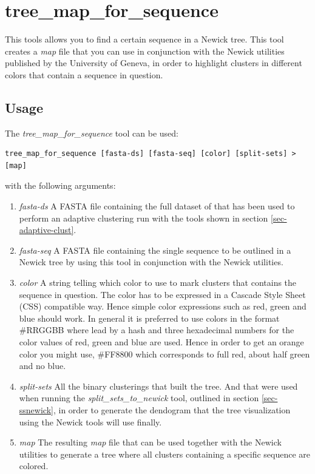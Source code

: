 \section{tree\_map\_for\_sequence} \label{sec-treemapseq}

This tools allows you to find a certain sequence in a Newick tree. This
tool creates a \emph{map} file that you can use in conjunction with the
Newick utilities \cite{newick_tools} published by the University of Geneva, in
order to highlight clusters in different colors that contain a
sequence in question.

\subsection{Usage}

The \emph{tree\_map\_for\_sequence} tool can be used:
\begin{lstlisting}
tree_map_for_sequence [fasta-ds] [fasta-seq] [color] [split-sets] > [map]
\end{lstlisting}
with the following arguments:
\begin{enumerate}
  \item \emph{fasta-ds} A FASTA file containing the full dataset of
    that has been used to perform an adaptive clustering run with the
    tools shown in section \ref{sec-adaptive-clust}.
  \item \emph{fasta-seq} A FASTA file containing the single sequence
    to be outlined in a Newick tree by using this tool in conjunction
    with the Newick utilities.
  \item \emph{color} A string telling which color to use to mark
    clusters that contains the sequence in question. The color has to
    be expressed in a Cascade Style Sheet (CSS) compatible way. Hence
    simple color expressions such as red, green and blue should
    work. In general it is preferred to use colors in the format
    \#RRGGBB where lead by a hash and three hexadecimal numbers for the
    color values of red, green and blue are used. Hence in order to
    get an orange color you might use, \#FF8800 which corresponds to
    full red, about half green and no blue. 
  \item \emph{split-sets} All the binary clusterings that built the
    tree. And that were used when running the
    \emph{split\_sets\_to\_newick} tool, outlined in section
    \ref{sec-ssnewick}, in order to generate the
    dendogram that the tree visualization using the Newick tools will
    use finally.
  \item \emph{map}
    The resulting \emph{map} file that can be used together with the
    Newick utilities to generate a tree where all clusters containing
    a specific sequence are colored.
\end{enumerate}

